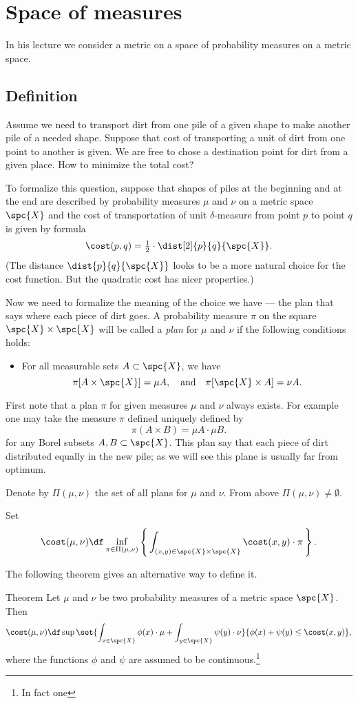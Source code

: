 \chapter{Space of measures}

In his lecture we consider a metric on a space of probability measures on a metric space.

\section{Definition}

Assume we need to transport dirt from one pile of a given shape to make another pile of a needed shape.
Suppose that cost of transporting a unit of dirt from one point to another is given.
We are free to chose a destination point for dirt from a given place.
How to minimize the total cost?

To formalize this question, suppose that shapes of piles at the beginning and at the end are described by probability measures $\mu$ and $\nu$ on a metric space $\spc{X}$ and the cost of transportation 
of unit $\delta$-measure from point $p$ to point $q$ is given by formula
\[\cost(p,q)=\tfrac12\cdot\dist[2]{p}{q}{\spc{X}}.\]
(The distance $\dist{p}{q}{\spc{X}}$ looks to be a more natural choice for the cost function.
But the quadratic cost has nicer properties.)

Now we need to formalize the meaning of the choice we have --- the plan that says where each piece of dirt goes.
A probability measure $\pi$ on the square $\spc{X}\times\spc{X}$ will be called a \emph{plan} for $\mu$ and $\nu$ if the following conditions holds:
\begin{itemize}
\item For all measurable sets $A \subset \spc{X}$, we have 
\[\pi [A \times \spc{X}] = \mu A,\quad\text{and}\quad \pi [  \spc{X}\times A] = \nu A.\]
\end{itemize}

First note that a plan $\pi$ for given measures $\mu$ and $\nu$ always exists.
For example one may take the measure $\pi$ defined uniquely defined by 
\[\pi(A\times B)=\mu A\cdot \mu B.\]
for any Borel subsets $A,B\subset\spc{X}$.
This plan say that each piece of dirt distributed equally in the new pile; as we will see this plane is usually far from optimum.

Denote by $\Pi(\mu,\nu)$ the set of all plans for $\mu$ and $\nu$.
From above $\Pi(\mu,\nu)\ne\emptyset$.

Set
\[\cost(\mu,\nu)
\df
\inf_{\pi\in\Pi(\mu,\nu)}
\left\{\,\int_{(x,y)\in\spc{X}\times\spc{X}}\cost(x,y)\cdot\pi\,\right\}.\]

The following theorem gives an alternative way to define it.

\begin{thm}{Theorem}
Let $\mu$ and $\nu$ be two probability measures of a metric space $\spc{X}$.
Then 
\[\cost(\mu,\nu)
\df
\sup\set{\int_{x\in\spc{X}}\phi(x)\cdot\mu+\int_{y\in\spc{X}}\psi(y)\cdot\nu}{\phi(x)+\psi(y)\le \cost(x,y)},\]
where the functions $\phi$ and $\psi$ are assumed to be continuous.\footnote{In fact one }
\end{thm}




